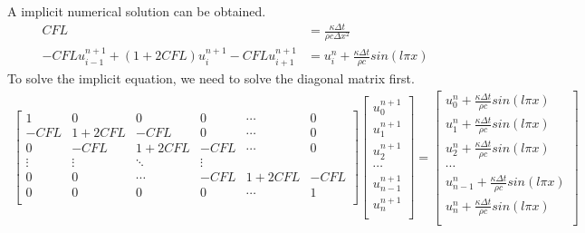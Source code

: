 \documentclass[a4paper]{article}
\begin{document}
        A implicit numerical solution can be obtained.
        \begin{align*}
            CFL &= \frac{\kappa \Delta t}{\rho c \Delta x^2} \\
            -CFL u^{n+1}_{i-1} + (1+2CFL)u^{n+1}_i - CFL u^{n+1}_{i+1} &= u^n_i + \frac{\kappa \Delta t}{\rho c}sin(l \pi x)
        \end{align*}
        To solve the implicit equation, we need to solve the diagonal matrix first.
        \begin{align*}
            \left[
                \begin{matrix}
                    1        & 0           & 0       & 0        & \cdots   & 0      \\
                    -CFL     & 1+2CFL      & -CFL    & 0        &\cdots    & 0      \\
                    0        & -CFL        & 1+2CFL  & -CFL     &\cdots    & 0      \\
                    \vdots & \vdots & \ddots & \vdots \\
                    0        & 0           &\cdots   & -CFL     & 1+2CFL   & -CFL   \\
                    0        & 0           & 0       & 0        & \cdots   & 1      \\
                \end{matrix}
            \right]
            \left[
                \begin{matrix}
                    u^{n+1}_0 \\ u^{n+1}_1 \\ u^{n+1}_2 \\ \cdots \\ u^{n+1}_{n-1} \\ u^{n+1}_n \\           
                \end{matrix}
            \right]
            =
            \left[
                \begin{matrix}
                    u^{n}_0 + \frac{\kappa \Delta t}{\rho c}sin(l \pi x) \\ 
                    u^{n}_1 + \frac{\kappa \Delta t}{\rho c}sin(l \pi x) \\ 
                    u^{n}_2 + \frac{\kappa \Delta t}{\rho c}sin(l \pi x) \\
                    \cdots \\ 
                    u^{n}_{n-1} + \frac{\kappa \Delta t}{\rho c}sin(l \pi x) \\ 
                    u^{n}_n + \frac{\kappa \Delta t}{\rho c}sin(l \pi x) \\           
                \end{matrix}
            \right]
        \end{align*}
\end{document}
